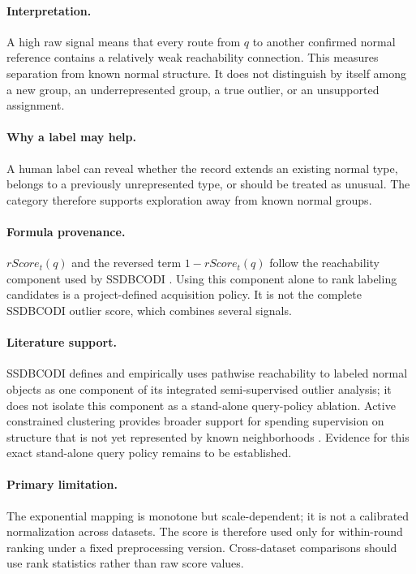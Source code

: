 \documentclass[11pt]{article}
\begin{document}
\paragraph{Interpretation.}
A high raw signal means that every route from $q$ to another confirmed normal
reference contains a relatively weak reachability connection. This measures
separation from known normal structure. It does not distinguish by itself among
a new group, an underrepresented group, a true outlier, or an unsupported
assignment.

\paragraph{Why a label may help.}
A human label can reveal whether the record extends an existing normal type,
belongs to a previously unrepresented type, or should be treated as unusual.
The category therefore supports exploration away from known normal groups.

\paragraph{Formula provenance.}
$rScore_t(q)$ and the reversed term $1-rScore_t(q)$ follow the reachability
component used by SSDBCODI \cite{deng2022ssdbcodi}. Using this component alone
to rank labeling candidates is a project-defined acquisition policy. It is not
the complete SSDBCODI outlier score, which combines several signals.

\paragraph{Literature support.}
SSDBCODI defines and empirically uses pathwise reachability to labeled normal
objects as one component of its integrated semi-supervised outlier analysis; it
does not isolate this component as a stand-alone query-policy ablation. Active constrained
clustering provides broader support for spending supervision on structure that
is not yet represented by known neighborhoods \cite{basu2004active}. Evidence
for this exact stand-alone query policy remains to be established.

\paragraph{Primary limitation.}
The exponential mapping is monotone but scale-dependent; it is not a calibrated
normalization across datasets. The score is therefore used only for within-round
ranking under a fixed preprocessing version. Cross-dataset comparisons should
use rank statistics rather than raw score values.
\end{document}
